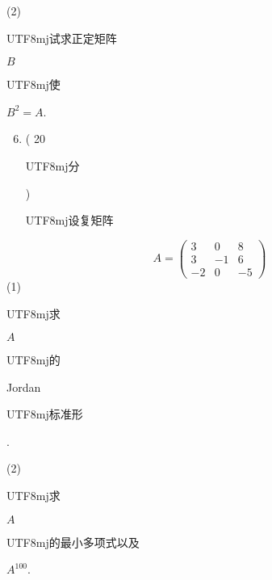 \documentclass[10pt]{article}
\begin{document}
(2) \begin{CJK}{UTF8}{mj}试求正定矩阵\end{CJK} $B$ \begin{CJK}{UTF8}{mj}使\end{CJK} $B^{2}=A$.

\begin{enumerate}
  \setcounter{enumi}{5}
  \item ( 20 \begin{CJK}{UTF8}{mj}分\end{CJK}) \begin{CJK}{UTF8}{mj}设复矩阵\end{CJK}
\end{enumerate}
$$
A=\left(\begin{array}{ccc}
3 & 0 & 8 \\
3 & -1 & 6 \\
-2 & 0 & -5
\end{array}\right)
$$
(1) \begin{CJK}{UTF8}{mj}求\end{CJK} $A$ \begin{CJK}{UTF8}{mj}的\end{CJK} Jordan \begin{CJK}{UTF8}{mj}标准形\end{CJK}.

(2) \begin{CJK}{UTF8}{mj}求\end{CJK} $A$ \begin{CJK}{UTF8}{mj}的最小多项式以及\end{CJK} $A^{100}$.
\end{document}
